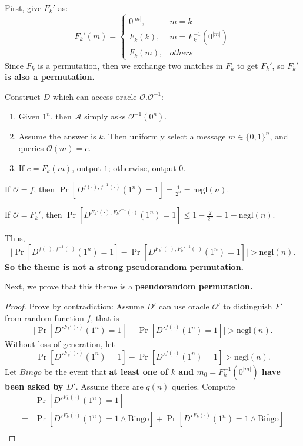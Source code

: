 \documentclass[12pt]{article}
\newcommand{\negl}{\text{negl}}
\newcommand{\Bingo}{\text{Bingo}}
\newcommand{\A}{\mathcal{A}}
\newcommand{\OO}{\mathcal{O}}
\newenvironment{problem}[2][Problem]{\begin{trivlist}
\item[\hskip \labelsep {\bfseries #1}\hskip \labelsep {\bfseries #2.}]}{\end{trivlist}}
\begin{document}
\begin{problem}{10}
First, give $F_k'$ as:
		\begin{equation*}  
			F_k'(m)= \begin{cases}
					0^{|m|}, & m=k \\  
					F_k(k), & m=F_k^{-1}(0^{|m|}) \\
					F_k(m), & others
				\end{cases} 
		\end{equation*}
Since $F_k$ is a permutation, then we exchange two matches in $F_k$ to get $F_k'$, so $F_k'$ \textbf{is also a permutation.}\par\vspace{2ex}
Construct $D$ which can access oracle $\OO.\OO^{-1}$:
\begin{enumerate}
    \item Given $1^n$, then $\A$ simply asks $\OO^{-1}(0^n)$. 
    \item Assume the answer is $k$. Then uniformly select a message $m\in\{0,1\}^n$, and queries $\OO(m)=c$.
    \item If $c=F_k(m)$, output $1$; otherwise, output 0.
\end{enumerate}\par
If $\OO=f$, then $\Pr[{D}^{f(\cdot),f^{-1}(\cdot)}(1^n)=1]=\frac{1}{2^n}=\negl(n)$.\par
If $\OO=F_k'$, then $\Pr[{D}^{F_k'(\cdot),F_k'^{-1}(\cdot)}(1^n)=1]\le1-\frac{2}{2^n}=1-\negl(n).$\par
Thus,
\[\mid\Pr[{D}^{f(\cdot),f^{-1}(\cdot)}(1^n)=1]-\Pr[{D}^{F_k'(\cdot),F_k'^{-1}(\cdot)}(1^n)=1]\mid>\negl(n).\]
\textbf{So the theme is not a strong pseudorandom permutation.}\par\vspace{3ex}
Next, we prove that this theme is a \textbf{pseudorandom permutation.}\par
\begin{proof}
Prove by contradiction: Assume $D'$ can use oracle $\OO'$ to distinguish $F'$ from random function $f$, that is
\[\mid\Pr[{D'}^{F_k'(\cdot)}(1^n)=1]-\Pr[D'^{f(\cdot)}(1^n)=1]\mid>\negl(n).\]
Without loss of generation, let \[\Pr[{D'}^{F_k'(\cdot)}(1^n)=1]-\Pr[D'^{f(\cdot)}(1^n)=1]>\negl(n).\]
Let $Bingo$ be the event that \textbf{at least one of $k$ and $m_0=F_k^{-1}(0^{|m|})$ have been asked by $D'$}. Assume there are $q(n)$ queries.
Compute
\begin{align*}
    &\Pr[{D'}^{F_k(\cdot)}(1^n)=1]\\
    =&\Pr[{D'}^{F_k(\cdot)}(1^n)=1\land\Bingo]+\Pr[{D'}^{F_k(\cdot)}(1^n)=1\land\overline{\Bingo}]\\

\end{align*}
\end{proof}
\end{problem}
\end{document}
